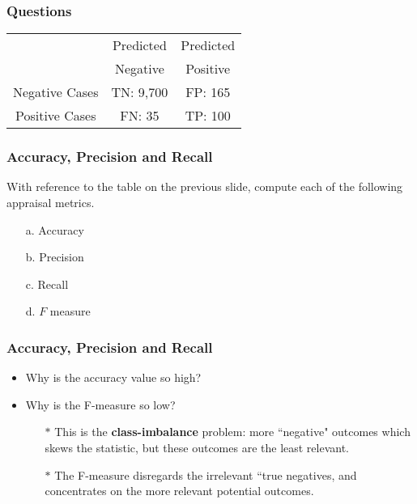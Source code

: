 \documentclass[a4]{beamer}
\begin{document}
\begin{frame}
	\frametitle{Questions}
	\large
	\begin{center}
		\begin{tabular}{|c|c|c|}
			\hline
			& Predicted  & Predicted \\
			& Negative & Positive \\ \hline
			Negative Cases & TN: 9,700  & FP: 165 \\ \hline
			Positive Cases & FN: 35 & TP: 100 \\ \hline
		\end{tabular} 
	\end{center}
\end{frame}
\begin{frame}
	\frametitle{Accuracy, Precision and Recall}
	
	With reference to the table on the previous slide, compute each of the following appraisal metrics.
	\begin{multicols}{2} 
		\begin{itemize}
			\item[a.] Accuracy
			\item[b.] Precision
			\item[c.] Recall
			\item[d.] $F$ measure
		\end{itemize}
	\end{multicols}
\end{frame}
\begin{frame}
	\frametitle{Accuracy, Precision and Recall}
	\begin{itemize}
		\item Why is the accuracy value so high?
		\item Why is the F-measure so low?
		\begin{itemize}
\item[$\ast$] This is the \textbf{class-imbalance} problem: more ``negative" outcomes which skews the statistic, but these outcomes are the least relevant.
\item[$\ast$] The F-measure disregards the irrelevant ``true negatives, and concentrates on the more relevant potential outcomes.

		\end{itemize}
		\end{itemize}
\end{frame}
\end{document}
